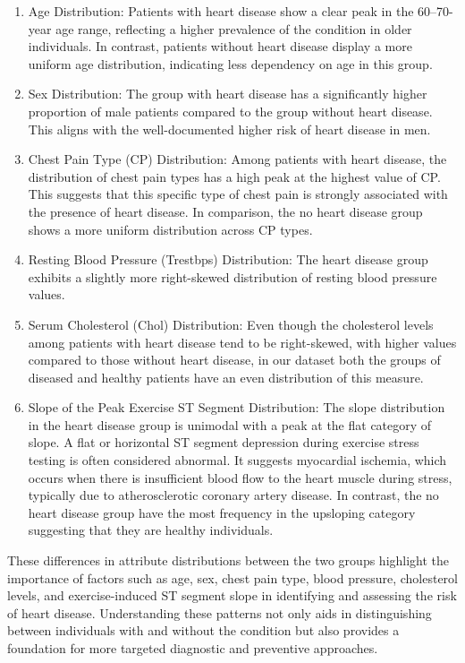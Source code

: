 \begin{enumerate}
    \item Age Distribution:
 Patients with heart disease show a clear peak in the 60–70-year age range, reflecting a higher prevalence of the condition in older individuals. In contrast, patients without heart disease display a more uniform age distribution, indicating less dependency on age in this group.

    \item Sex Distribution:
 The group with heart disease has a significantly higher proportion of male patients compared to the group without heart disease. This aligns with the well-documented higher risk of heart disease in men.

    \item Chest Pain Type (CP) Distribution:
Among patients with heart disease, the distribution of chest pain types has a high peak at the highest value of CP. This suggests that this specific type of chest pain is strongly associated with the presence of heart disease. In comparison, the no heart disease group shows a more uniform distribution across CP types.

    \item Resting Blood Pressure (Trestbps) Distribution:
The heart disease group exhibits a slightly more right-skewed distribution of resting blood pressure values.

    \item Serum Cholesterol (Chol) Distribution:
Even though the cholesterol levels among patients with heart disease tend to be right-skewed, with higher values compared to those without heart disease, in our dataset both the groups of diseased and healthy patients have an even distribution of this measure.

    \item Slope of the Peak Exercise ST Segment Distribution:
 The slope distribution in the heart disease group is unimodal with a peak at the flat category of slope. A flat or horizontal ST segment depression during exercise stress testing is often considered abnormal. It suggests myocardial ischemia, which occurs when there is insufficient blood flow to the heart muscle during stress, typically due to atherosclerotic coronary artery disease. In contrast, the no heart disease group have the most frequency in the upsloping category suggesting that they are healthy individuals. 
\end{enumerate}

These differences in attribute distributions between the two groups highlight the importance of factors such as age, sex, chest pain type, blood pressure, cholesterol levels, and exercise-induced ST segment slope in identifying and assessing the risk of heart disease. Understanding these patterns not only aids in distinguishing between individuals with and without the condition but also provides a foundation for more targeted diagnostic and preventive approaches.

